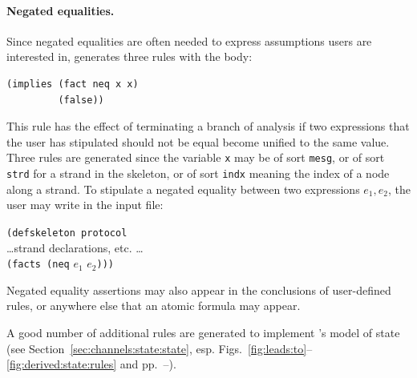 \paragraph{Negated equalities.}  Since negated equalities are often
needed to express assumptions users are interested in, {\cpsa}
generates three rules with the body:
%
\begin{verbatim}(implies (fact neq x x)
         (false))
\end{verbatim}
%
This rule has the effect of terminating a branch of analysis if two
expressions that the user has stipulated should not be equal become
unified to the same value.  Three rules are generated since the
variable \verb|x| may be of sort \verb|mesg|, or of sort \verb|strd|
for a strand in the skeleton, or of sort \verb|indx| meaning the index
of a node along a strand.  To stipulate a negated equality between two
expressions $e_1,e_2$, the user may write in the input file:
%
\begin{tabbing}
\texttt{(de}\=\texttt{fskeleton protocol}  \\
  \>\dots strand declarations, etc. \dots \\
  \>\texttt{(facts (neq} $e_1$ $e_2$\texttt{)))}
\end{tabbing}
%
Negated equality assertions may also appear in the conclusions of
user-defined rules, or anywhere else that an atomic formula may
appear.

A good number of additional rules are generated to implement {\cpsa}'s
model of state (see Section~\ref{sec:channels:state:state},
esp. Figs.~\ref{fig:leads:to}--\ref{fig:derived:state:rules} and
pp.~\pageref{state:gen:rules:start}--\pageref{state:gen:rules:end}).


